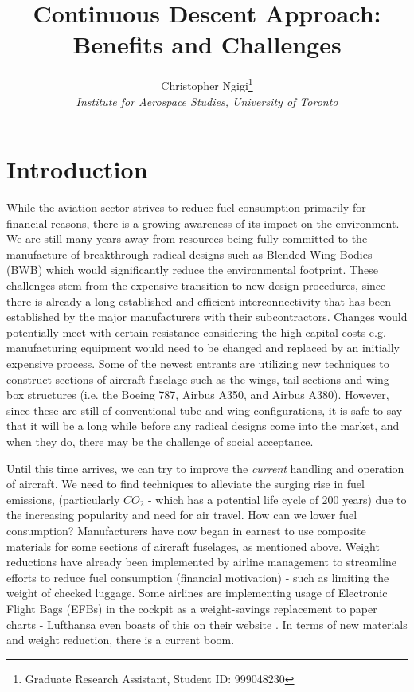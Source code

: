 \documentclass{aer1315-pretty}
\author[]{ %
Christopher Ngigi\thanks{Graduate Research Assistant, Student ID: 999048230}\\
\textit{Institute for Aerospace Studies, University of Toronto}}
\title{Continuous Descent Approach: Benefits and Challenges}
\begin{document}
\maketitle

\section{Introduction}
While the aviation sector strives to reduce fuel consumption primarily for financial reasons, there is a growing awareness of its impact on the environment. We are still many years away from  resources being fully committed to the manufacture of breakthrough radical designs such as Blended Wing Bodies (BWB) which would significantly reduce the environmental footprint. These challenges stem from the expensive transition to new design procedures, since there is already a long-established and efficient interconnectivity that has been established by the major manufacturers with their subcontractors. Changes would potentially meet with certain resistance considering the high capital costs e.g. manufacturing equipment would need to be changed and replaced by an initially expensive process. Some of the newest entrants are utilizing new techniques to construct sections of aircraft fuselage such as the wings, tail sections and wing-box structures (i.e. the Boeing 787, Airbus A350, and Airbus A380). However, since these are still of conventional tube-and-wing configurations,  it is safe to say that it will be a long while  before any radical designs come into the market, and when they do, there may be the challenge of social acceptance.\par

Until this time arrives, we can try to improve the \textit{current} handling and operation of aircraft. We need to find techniques to alleviate the surging rise in fuel emissions, (particularly $CO_2$ - which has a potential life cycle of 200 years) due to the increasing popularity and need for air travel. How can we lower fuel consumption? Manufacturers have now began in earnest to use composite materials for some sections of aircraft fuselages, as mentioned above. Weight reductions have already been implemented by airline management to streamline efforts to reduce fuel consumption (financial motivation) - such as limiting the weight of checked luggage. Some airlines are implementing usage of Electronic Flight Bags (EFBs) in the cockpit as a weight-savings replacement to paper charts - Lufthansa even boasts of this on their website \cite{Lufty}. In terms of new materials and weight reduction, there is a current boom.\par
\end{document}
